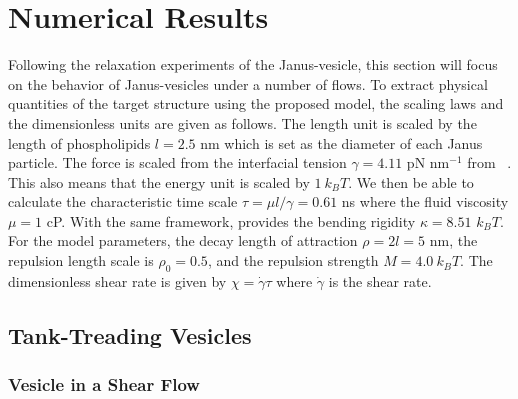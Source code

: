 \documentclass[lineno]{jfm}
\begin{document}
\section{\label{results}Numerical Results}


Following the relaxation experiments of the Janus-vesicle, this section will focus on the behavior of 
Janus-vesicles under a number of flows. To extract physical quantities of the target structure using the
proposed model, the scaling laws and the dimensionless units are given as follows.
The length unit is scaled by the length of phospholipids $l=2.5$ nm which is set as the diameter of each 
Janus particle. The force is scaled from the interfacial tension $\gamma=4.11$ pN nm$^{-1}$ 
from ~\cite{Ryham16}. This also means that the energy unit is scaled by $1\ k_BT$. We then be able to
calculate the characteristic time scale $\tau = \mu l/\gamma = 0.61$ ns where the fluid viscosity $\mu=1$ cP.
With the same framework, \cite{Fu20} provides the bending rigidity $\kappa=8.51$ $k_BT$.
%
For the model parameters, the decay length of attraction $\rho = 2l = 5$ nm, the repulsion length scale is 
$\rho_0=0.5$, and the repulsion strength $M=4.0\ k_BT$.
The dimensionless shear rate is given by $\chi = \dot\gamma \tau$ where $\dot\gamma$ is the shear rate.





\subsection{Tank-Treading Vesicles}

\subsubsection{Vesicle in a Shear Flow}
\end{document}
